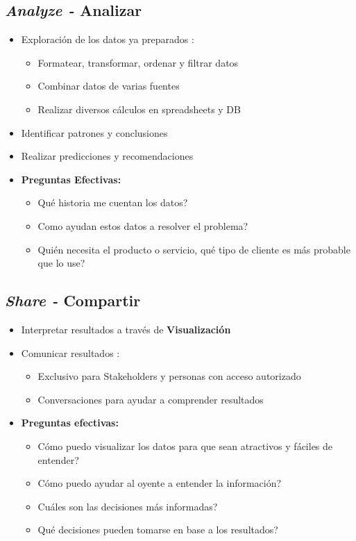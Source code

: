 \subsection{\textit{Analyze - }Analizar}
\begin{itemize}
    \item {Exploración de los datos ya preparados :
    \begin{itemize}
        \item {Formatear, transformar, ordenar y filtrar datos}
        \item {Combinar datos de varias fuentes}
        \item {Realizar diversos cálculos en spreadsheets y DB}
    \end{itemize}}
    \item {Identificar patrones y conclusiones}
    \item {Realizar predicciones y recomendaciones}
    \item {\textbf{Preguntas Efectivas:}
    \begin{itemize}
        \item {Qué historia me cuentan los datos?}
        \item {Como ayudan estos datos a resolver el problema?}
        \item {Quién necesita el producto o servicio, qué tipo de cliente es más probable que lo use?}
    \end{itemize}}
\end{itemize}

\subsection{\textit{Share - }Compartir}
\begin{itemize}
    \item {Interpretar resultados a través de \textbf{Visualización}}
    \item {Comunicar resultados : 
    \begin{itemize}
        \item {Exclusivo para Stakeholders y personas con acceso autorizado}
        \item {Conversaciones para ayudar a comprender resultados}
    \end{itemize}}
    \item {\textbf{Preguntas efectivas:}
    \begin{itemize}
        \item {Cómo puedo visualizar los datos para que sean atractivos y fáciles de entender?}
        \item {Cómo puedo ayudar al oyente a entender la información?}
        \item {Cuáles son las decisiones más informadas?}
        \item {Qué decisiones pueden tomarse en base a los resultados?}
    \end{itemize}}
\end{itemize}

